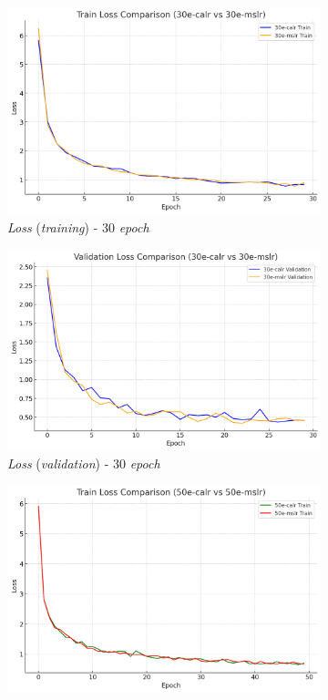 \begin{figure}[htbp]
  \centering
  \begin{subfigure}{0.45\textwidth}
    \includegraphics[width=\textwidth]{gambar/bab4-train-loss-30e.png}
    \caption{\emph{Loss} (\emph{training}) - 30 \emph{epoch}}
  \end{subfigure}
  \hfill
  \begin{subfigure}{0.45\textwidth}
    \includegraphics[width=\textwidth]{gambar/bab4-val-loss-30e.png}
    \caption{\emph{Loss} (\emph{validation}) - 30 \emph{epoch}}
  \end{subfigure}
  \hfill
  \begin{subfigure}{0.45\textwidth}
    \includegraphics[width=\textwidth]{gambar/bab4-train-loss-50e.png}

\end{subfigure}
\end{figure}
